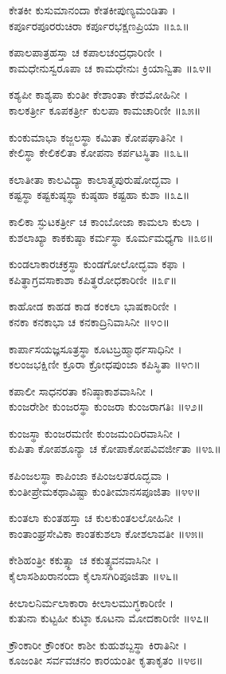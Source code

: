 ಕೇತಕೀ ಕುಸುಮಾನಂದಾ ಕೇತಕೀಪುಣ್ಯಮಂಡಿತಾ ।\\
ಕರ್ಪೂರಪೂರರುಚಿರಾ ಕರ್ಪೂರಭಕ್ಷಣಪ್ರಿಯಾ ॥೩೩॥

ಕಪಾಲಪಾತ್ರಹಸ್ತಾ ಚ ಕಪಾಲಚಂದ್ರಧಾರಿಣೀ ।\\
ಕಾಮಧೇನುಸ್ವರೂಪಾ ಚ ಕಾಮಧೇನುಃ ಕ್ರಿಯಾನ್ವಿತಾ ॥೩೪॥

ಕಶ್ಯಪೀ ಕಾಶ್ಯಪಾ ಕುಂತೀ ಕೇಶಾಂತಾ ಕೇಶಮೋಹಿನೀ ।\\
ಕಾಲಕರ್ತ್ರೀ ಕೂಪಕರ್ತ್ರೀ ಕುಲಪಾ ಕಾಮಚಾರಿಣೀ ॥೩೫॥

ಕುಂಕುಮಾಭಾ ಕಜ್ಜಲಸ್ಥಾ ಕಮಿತಾ ಕೋಪಘಾತಿನೀ ।\\
ಕೇಲಿಸ್ಥಾ ಕೇಲಿಕಲಿತಾ ಕೋಪನಾ ಕರ್ಪಟಸ್ಥಿತಾ ॥೩೬॥

ಕಲಾತೀತಾ ಕಾಲವಿದ್ಯಾ ಕಾಲಾತ್ಮಪುರುಷೋದ್ಭವಾ ।\\
ಕಷ್ಟಸ್ಥಾ ಕಷ್ಟಕುಷ್ಠಸ್ಥಾ ಕುಷ್ಠಹಾ ಕಷ್ಟಹಾ ಕುಶಾ ॥೩೭॥

ಕಾಲಿಕಾ ಸ್ಫುಟಕರ್ತ್ರೀ ಚ ಕಾಂಬೋಜಾ ಕಾಮಲಾ ಕುಲಾ ।\\
ಕುಶಲಾಖ್ಯಾ ಕಾಕಕುಷ್ಠಾ ಕರ್ಮಸ್ಥಾ ಕೂರ್ಮಮಧ್ಯಗಾ ॥೩೮॥

ಕುಂಡಲಾಕಾರಚಕ್ರಸ್ಥಾ ಕುಂಡಗೋಲೋದ್ಭವಾ ಕಫಾ ।\\
ಕಪಿತ್ಥಾಗ್ರವಸಾಕಾಶಾ ಕಪಿತ್ಥರೋಧಕಾರಿಣೀ ॥೩೯॥

ಕಾಹೋಡ ಕಾಹಡ ಕಾಡ ಕಂಕಲಾ ಭಾಷಕಾರಿಣೀ ।\\
ಕನಕಾ ಕನಕಾಭಾ ಚ ಕನಕಾದ್ರಿನಿವಾಸಿನೀ ॥೪೦॥

ಕಾರ್ಪಾಸಯಜ್ಞಸೂತ್ರಸ್ಥಾ ಕೂಟಬ್ರಹ್ಮಾರ್ಥಸಾಧಿನೀ ।\\
ಕಲಂಜಭಕ್ಷಿಣೀ ಕ್ರೂರಾ ಕ್ರೋಧಪುಂಜಾ ಕಪಿಸ್ಥಿತಾ ॥೪೧॥

ಕಪಾಲೀ ಸಾಧನರತಾ ಕನಿಷ್ಠಾಕಾಶವಾಸಿನೀ ।\\
ಕುಂಜರೇಶೀ ಕುಂಜರಸ್ಥಾ ಕುಂಜರಾ ಕುಂಜರಾಗತಿಃ ॥೪೨॥

ಕುಂಜಸ್ಥಾ ಕುಂಜರಮಣೀ ಕುಂಜಮಂದಿರವಾಸಿನೀ ।\\
ಕುಪಿತಾ ಕೋಪಶೂನ್ಯಾ ಚ ಕೋಪಾಕೋಪವಿವರ್ಜೀತಾ ॥೪೩॥

ಕಪಿಂಜಲಸ್ಥಾ ಕಾಪಿಂಜಾ ಕಪಿಂಜಲತರೂದ್ಭವಾ ।\\
ಕುಂತೀಪ್ರೇಮಕಥಾವಿಷ್ಟಾ ಕುಂತೀಮಾನಸಪೂಜಿತಾ ॥೪೪॥

ಕುಂತಲಾ ಕುಂತಹಸ್ತಾ ಚ ಕುಲಕುಂತಲಲೋಹಿನೀ ।\\
ಕಾಂತಾಂಘ್ರಸೇವಿಕಾ ಕಾಂತಕುಶಲಾ ಕೋಶಲಾವತೀ ॥೪೫॥

ಕೇಶಿಹಂತ್ರೀ ಕಕುತ್ಸ್ಥಾ ಚ ಕಕುತ್ಸ್ಥವನವಾಸಿನೀ ।\\
ಕೈಲಾಸಶಿಖರಾನಂದಾ ಕೈಲಾಸಗಿರಿಪೂಜಿತಾ ॥೪೬॥

ಕೀಲಾಲನಿರ್ಮಲಾಕಾರಾ ಕೀಲಾಲಮುಗ್ಧಕಾರಿಣೀ ।\\
ಕುತುನಾ ಕುಟ್ಟಹೀ ಕುಟ್ಠಾ ಕೂಟನಾ ಮೋದಕಾರಿಣೀ ॥೪೭॥

ಕ್ರೌಂಕಾರೀ ಕ್ರೌಂಕರೀ ಕಾಶೀ ಕುಹುಶಬ್ದಸ್ಥಾ ಕಿರಾತಿನೀ ।\\
ಕೂಜಂತೀ ಸರ್ವವಚನಂ ಕಾರಯಂತೀ ಕೃತಾಕೃತಂ ॥೪೮॥

